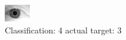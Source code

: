 \begin{figure}[h!]
\begin{center}
\includegraphics[width=0.60\columnwidth]{figures/ID2083_class_4_target_3.png}
\end{center}
\caption{ Classification: 4 actual target: 3}
\label{fig:ID2083_class_4_target_3}
\end{figure}
